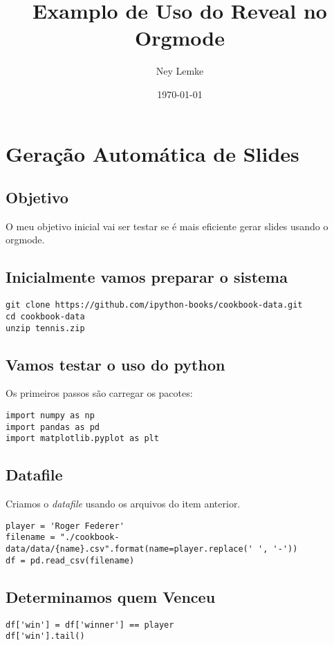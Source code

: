 \documentclass[11pt]{article}
\author{Ney Lemke}
\date{\today}
\title{Examplo de Uso do Reveal no Orgmode}
\begin{document}
\maketitle
\setcounter{tocdepth}{1}
\tableofcontents


\section*{Geração Automática de Slides}
\label{sec:org3b475a4}

\subsection*{Objetivo}
\label{sec:org2448c48}
O meu objetivo inicial vai ser testar se é mais eficiente gerar 
slides usando o orgmode. 

\subsection*{Inicialmente vamos preparar o sistema}
\label{sec:org67cff91}
\begin{verbatim}
git clone https://github.com/ipython-books/cookbook-data.git
cd cookbook-data
unzip tennis.zip
\end{verbatim}

\subsection*{Vamos testar o uso do python}
\label{sec:orga1d3243}
Os primeiros passos são carregar os pacotes:

\begin{verbatim}
import numpy as np
import pandas as pd
import matplotlib.pyplot as plt
\end{verbatim}

\subsection*{Datafile}
\label{sec:orgb404e8a}

Criamos o \emph{datafile} usando os arquivos do item anterior. 

\begin{verbatim}
player = 'Roger Federer'
filename = "./cookbook-data/data/{name}.csv".format(name=player.replace(' ', '-')) 
df = pd.read_csv(filename)
\end{verbatim}

\subsection*{Determinamos quem Venceu}
\label{sec:orgefba962}
\begin{verbatim}
df['win'] = df['winner'] == player
df['win'].tail()
\end{verbatim}
\end{document}

